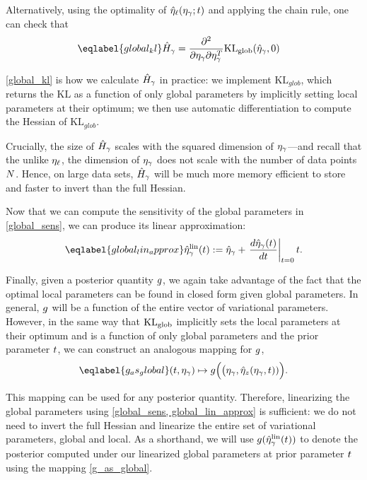 Alternatively, using the optimality of $\hat\eta_{\ell}(\eta_\gamma; t)$ and
applying the chain rule, one can check that
\begin{align}\eqlabel{global_kl}
\hessopt_{\gamma} &=
\frac{\partial^2}{\partial\eta_\gamma\partial\eta_\gamma^T}
\KLglobal(\etaopt_\gamma, 0)
\end{align}

\eqref{global_kl} is how we calculate $\hat{H}_\gamma$ in practice:
we implement $\mathrm{KL}_{glob}$, which returns the $\mathrm{KL}$ as a function of only global parameters
by implicitly setting local parameters at their optimum;
we then use automatic differentiation to
compute the Hessian of $\mathrm{KL}_{glob}$.

Crucially, the size of $\hat{H}_\gamma$ scales with the squared dimension
of $\eta_{\gamma}$---and recall that the unlike $\eta_{\ell}$, the dimension of
$\eta_{\gamma}$ does not scale with the number of data points $N$.
Hence, on large data sets, $\hat{H}_\gamma$ will be much more memory efficient
to store and faster to invert than the full Hessian.

Now that we can compute the sensitivity of the global parameters in
\eqref{global_sens}, we can produce its linear approximation:
\begin{align}\eqlabel{global_lin_approx}
  \etalin_\gamma(\t) := \etaopt_\gamma +
  \fracat{d \etaopt_\gamma(\t)}{d \t}{\t=0} \t .
\end{align}

Finally, given a posterior quantity $g$,
we again take advantage of the fact that the optimal
local parameters can be found in closed form given global parameters.
In general, $g$ will be a function of the entire vector of variational parameters.
However, in the same way that $\mathrm{KL}_{\mathrm{glob}}$ implicitly sets the local parameters at their optimum
and is a function of only global parameters and the prior parameter $t$,
we can construct an analogous mapping for $g$,
\begin{align}\eqlabel{g_as_global}
(\t, \etaglob) \mapsto g\Big(\big(\etaglob, \etaoptz(\etaglob, \t))\Big).
\end{align}

This mapping can be used for any posterior quantity.
Therefore, linearizing the global parameters using \eqref{global_sens, global_lin_approx} is sufficient:
we do not need to invert the full Hessian
and linearize the entire set of variational parameters, global and local.
As a shorthand, we will use $g(\hat\eta^{\mathrm{lin}}_\gamma(t))$ to
denote the posterior computed under our linearized global parameters
at prior parameter $t$ using the mapping \eqref{g_as_global}.

